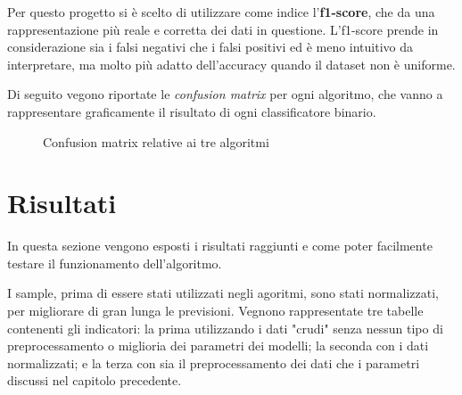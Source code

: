\documentclass[12pt,a4paper]{article}
\begin{document}
Per questo progetto si è scelto di utilizzare come indice l'\textbf{f1-score}, che da una rappresentazione più reale e corretta dei dati in questione. L'f1-score prende in considerazione sia i falsi negativi che i falsi positivi ed è meno intuitivo da interpretare, ma molto più adatto dell'accuracy quando il dataset non è uniforme.

Di seguito vegono riportate le \textit{confusion matrix} per ogni algoritmo, che vanno a rappresentare graficamente il risultato di ogni classificatore binario.

\begin{figure}[H]
    \centering
    \caption{Confusion matrix relative ai tre algoritmi}
\end{figure}


\clearpage
\section{Risultati}
In questa sezione vengono esposti i risultati raggiunti e come poter facilmente testare il funzionamento dell'algoritmo.



I sample, prima di essere stati utilizzati negli agoritmi, sono stati normalizzati, per migliorare di gran lunga le previsioni. Vegnono rappresentate tre tabelle contenenti gli indicatori: la prima utilizzando i dati "crudi" senza nessun tipo di preprocessamento o miglioria dei parametri dei modelli; la seconda con i dati normalizzati; e la terza con sia il preprocessamento dei dati che i parametri discussi nel capitolo precedente.
\end{document}
